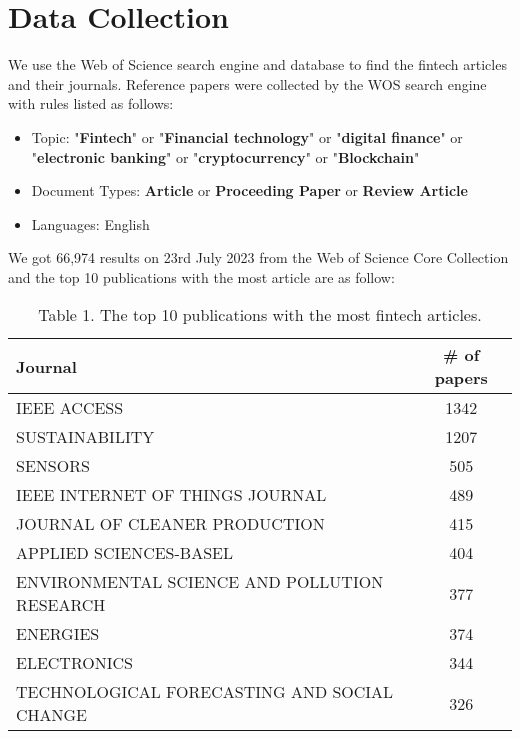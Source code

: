 \section{Data Collection}
We use the Web of Science search engine and database to find the fintech articles and their journals.
Reference papers were collected by the WOS search engine with rules listed as follows:
\begin{itemize}
    \item Topic: "\textbf{Fintech}" or "\textbf{Financial technology}" or "\textbf{digital finance}" or "\textbf{electronic banking}" or "\textbf{cryptocurrency}" or "\textbf{Blockchain}"
    \item Document Types: \textbf{Article} or \textbf{Proceeding Paper} or \textbf{Review Article}
    \item Languages: English
\end{itemize}

We got 66,974 results on 23rd July 2023 from the Web of Science Core Collection and the top 10 publications with the most article are as follow:

\begin{table}
\caption{Table 1. The top 10 publications with the most fintech articles.}
\centering
    \begin{tabular}{lc}
    Journal                                      & \# of papers \\ \hline
    IEEE ACCESS                                  & 1342         \\
    SUSTAINABILITY                               & 1207         \\
    SENSORS                                      & 505          \\
    IEEE INTERNET OF THINGS JOURNAL              & 489          \\
    JOURNAL OF CLEANER PRODUCTION                & 415          \\
    APPLIED SCIENCES-BASEL                       & 404          \\
    ENVIRONMENTAL SCIENCE AND POLLUTION RESEARCH & 377          \\
    ENERGIES                                     & 374          \\
    ELECTRONICS                                  & 344          \\
    TECHNOLOGICAL FORECASTING AND SOCIAL CHANGE  & 326         
    \end{tabular}
    \end{table}

